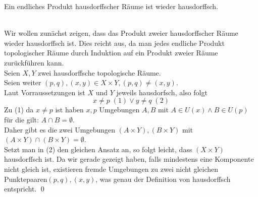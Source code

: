 \begin{Satz}
	Ein endliches Produkt hausdorffscher Räume ist wieder hausdorffsch.
\end{Satz}
%
	\\
	Wir wollen zunächst zeigen, dass das Produkt zweier hausdorffscher Räume wieder hausdorffsch ist. Dies reicht aus, da man jedes endliche Produkt topologischer Räume
	durch Induktion auf ein Produkt zweier Räume zurückführen kann. \\
	Seien \(X, Y\) zwei hausdorffsche topologische Räume.\\
	Seien weiter \( (p,q), (x,y) \in X \times Y, (p,q) \ne (x,y) \). \\
	Laut Vorraussetzungen ist \(X\) und \(Y\) jeweils hausdorfsch, also folgt 
	\[x \ne p \; (1) \lor y \ne q \; (2) \]
	Zu (1) da \(x \ne p \) ist haben \(x, p \) Umgebungen \(A, B \) mit \( A \in U(x)  \land B \in U(p) \) für die gilt: \(A \cap B = \emptyset \).\\ Daher gibt es die
	zwei Umgebungen \( (A \times Y), (B \times Y) \) mit \( (A \times Y) \cap (B \times Y) = \emptyset \). \\
	Setzt man in (2) den gleichen Ansatz an, so folgt leicht, dass \( (X \times Y) \) hausdorffsch ist. Da wir gerade gezeigt haben, falls mindestens eine Komponente
	nicht gleich ist,	existieren fremde Umgebungen zu zwei nicht gleichen Punktepaaren\( (p,q), (x,y) \), was genau der Definition von hausdorffsch entspricht.
\qed


